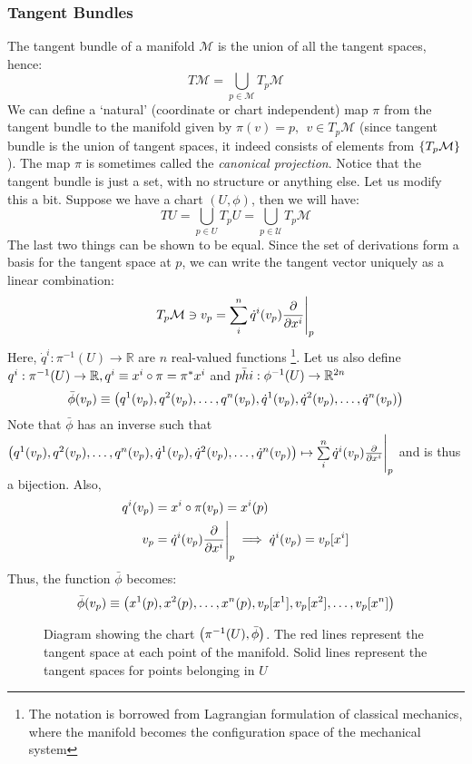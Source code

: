 \subsubsection{Tangent Bundles}
The tangent bundle of a manifold $\mathcal{M}$ is the union of all the tangent spaces, hence: 
$$T\mathcal{M} = \bigcup\limits_{p\in \mathcal{M}}T_p\mathcal{M}$$
We can define a `natural' (coordinate or chart independent) map $\pi$ from the tangent bundle to the manifold given by $\pi(v) = p, \ \ v \in T_p\mathcal{M}$ (since tangent bundle is the union of tangent spaces, it indeed consists of elements from $\{T_p\mathcal M\}$). The map $\pi$ is sometimes called the \textit{canonical projection}.
Notice that the tangent bundle is just a set, with no structure or anything else. Let us modify this a bit. Suppose we have a chart $(U,\phi)$, then we will have:
$$TU =  \bigcup\limits_{p\in {U}}T_p{U}= \bigcup\limits_{p\in \mathcal{U}}T_p\mathcal{M}$$ 
The last two things can be shown to be equal. Since the set of derivations form a basis for the tangent space at $p$, we can write the tangent vector uniquely as a linear combination:
$$T_p\mathcal{M}\ni v_p = \sum\limits_{i}^n \dot{q}^i(v_p) \pdv{x^i}\Bigg|_p$$
Here, $\dot{q}^i: \pi^{-1}(U)\rightarrow \mathbb{R}$ are $n$ real-valued functions \footnote{The notation is borrowed from Lagrangian formulation of classical mechanics, where the manifold becomes the configuration space of the mechanical system}. Let us also define $q^i:\pi^{-1}(U)\rightarrow \mathbb{R}, {q}^i\equiv x^i\circ \pi = \pi^*x^i$ and $\bar{phi}:\phi^{-1}(U)\rightarrow \mathbb{R}^{2n}$
$$\bar{\phi}(v_p)\equiv \left( q^1(v_p), q^2(v_p),\ldots,q^n(v_p),\dot{q}^1(v_p), \dot{q}^2(v_p),\ldots,\dot{q}^n(v_p) \right)$$ 
Note that $\bar{\phi}$ has an inverse such that $\left( q^1(v_p), q^2(v_p),\ldots,q^n(v_p),\dot{q}^1(v_p), \dot{q}^2(v_p),\ldots,\dot{q}^n(v_p) \right) \mapsto \sum\limits_{i}^n \dot{q}^i(v_p) \pdv{x^i}\Bigg|_p$ and is thus a bijection. Also, 
\begin{align*}
  q^i(v_p) &= x^i\circ\pi(v_p) = x^i(p)\\
  v_p &= \dot{q}^i(v_p) \pdv{x^i}\Bigg|_p \implies  \dot{q}^i(v_p) = v_p[x^i]
\end{align*}
Thus, the function $\bar{\phi}$ becomes:
$$\bar{\phi}(v_p)\equiv \left( x^1(p), x^2(p),\ldots,x^n(p),v_p[x^1], v_p[x^2],\ldots,v_p[x^n] \right)$$ 
\begin{figure}[H]
  \centering 
  
  \caption{Diagram showing the chart $\left( \pi^{-1}(U),\bar{\phi} \right)$. The red lines represent the tangent space at each point of the manifold. Solid lines represent the tangent spaces for points belonging in $U$}
\end{figure}
